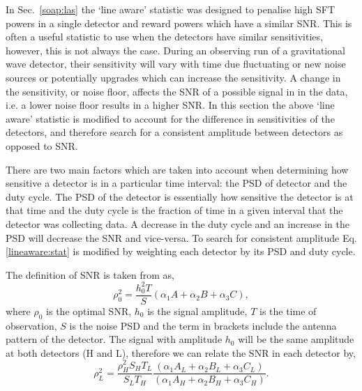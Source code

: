 In Sec.~\ref{soap:las} the `line aware' statistic was designed to penalise high \gls{SFT} powers in a single detector and reward powers which have a similar \gls{SNR}. This is often a useful statistic to use when the detectors have similar sensitivities, however, this is not always the case. During an observing run of a gravitational wave detector, their sensitivity will vary with time due fluctuating or new noise sources or potentially upgrades which can increase the sensitivity. A change in the sensitivity, or noise floor, affects the \gls{SNR} of a possible signal in in the data, i.e. a lower noise floor results in a higher \gls{SNR}. 
In this section the above `line aware' statistic is modified to account for the difference in sensitivities of the detectors, and therefore search for a consistent amplitude between detectors as opposed to \gls{SNR}.

There are two main factors which are taken into account when determining how sensitive a detector is in a particular time interval: the \gls{PSD} of detector and the duty cycle. The \gls{PSD} of the detector is essentially how sensitive the detector is at that time and the duty cycle is the fraction of time in a given interval that the detector was collecting data. A decrease in the duty cycle and an increase in the \gls{PSD} will decrease the \gls{SNR} and vice-versa. To search for consistent amplitude Eq.\ref{lineaware:stat} is modified by weighting each detector by its \gls{PSD} and duty cycle.

The definition of \gls{SNR} is taken from \citep{} as, 
\begin{equation}
    \rho_0^2 = \frac{h_0^2 T}{S}(\alpha_1A + \alpha_2B + \alpha_3C),
\end{equation}
where $\rho_0$ is the optimal \gls{SNR}, $h_0$ is the signal amplitude, $T$ is the time of observation, $S$ is the noise \gls{PSD} and the term in brackets include the antenna pattern of the detector. 
The signal with amplitude $h_0$ will be the same amplitude at both detectors (H and L), therefore we can relate the \gls{SNR} in each detector by,
\begin{equation}
\label{lineawareamp:snrequate}
    \rho_L^2 = \frac{\rho_H^2 S_H T_L}{S_L T_H} \frac{(\alpha_1A_L + \alpha_2B_L + \alpha_3C_L)}{(\alpha_1A_H + \alpha_2B_H + \alpha_3C_H)} .
\end{equation}

